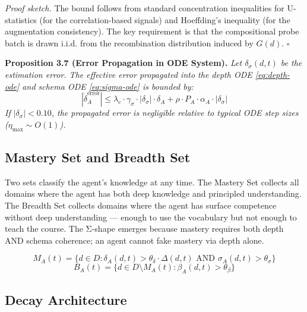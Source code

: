 \documentclass[10pt]{article}
\begin{document}
\textit{Proof sketch.} The bound follows from standard concentration
inequalities for U-statistics (for the correlation-based signals) and
Hoeffding's inequality (for the augmentation consistency). The key
requirement is that the compositional probe batch is drawn i.i.d. from
the recombination distribution induced by $G(d)$. $\square$

\textbf{Proposition 3.7 (Error Propagation in ODE System).} %
\textit{Let $\delta_\sigma(d,t)$ be the estimation error. The effective
error propagated into the depth ODE \eqref{eq:depth-ode} and schema ODE
\eqref{eq:sigma-ode} is bounded by:
\begin{equation}\label{eq:error-propagation}
|\dot{\delta}_A^{\text{error}}| \leq \lambda_c \cdot \gamma_\sigma \cdot |\delta_\sigma| \cdot \delta_A + \rho \cdot P_A \cdot \alpha_A \cdot |\delta_\sigma|
\end{equation}
If $|\delta_\sigma| < 0.10$, the propagated error is negligible relative
to typical ODE step sizes ($\eta_{\max} \sim O(1)$).}



\subsection{Mastery Set and Breadth Set}\label{sec:mastery-set}

Two sets classify the agent's knowledge at any time. The Mastery Set collects all domains where the agent has both deep knowledge and principled understanding. The Breadth Set collects domains where the agent has surface competence without deep understanding --- enough to use the vocabulary but not enough to teach the course. The Σ-shape emerges because mastery requires both depth AND schema coherence; an agent cannot fake mastery via depth alone.

\begin{equation}\label{eq:mastery-set}
M_A(t) = \{d \in D : \delta_A(d,t) > \theta_{\delta} \cdot \Delta(d,t) \text{ AND } \sigma_A(d,t) > \theta_{\sigma}\} %
\end{equation}
\begin{equation}\label{eq:breadth-set}
B_A(t) = \{d \in D \setminus M_A(t) : \beta_A(d,t) > \theta_{\beta}\}
\end{equation}

\subsection{Decay Architecture}\label{sec:decay}
\end{document}
